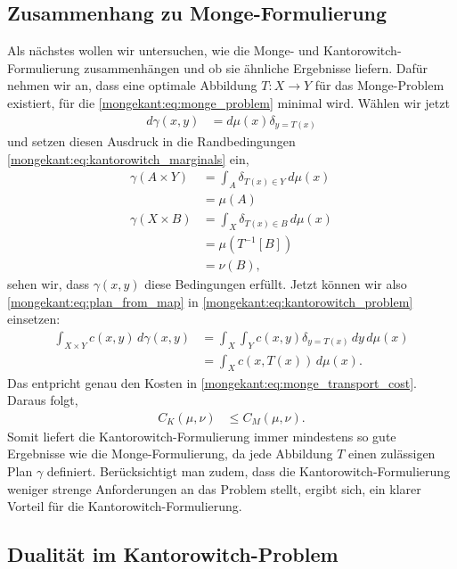 \subsection{Zusammenhang zu Monge-Formulierung%
\label{mongekant:subsection:monge_kantorowitch_connection}}
Als nächstes wollen wir untersuchen,
wie die Monge- und Kantorowitch-Formulierung zusammenhängen und
ob sie ähnliche Ergebnisse liefern.
Dafür nehmen wir an,
dass eine optimale Abbildung $T\colon X \to Y$ für das Monge-Problem existiert,
für die \eqref{mongekant:eq:monge_problem} minimal wird.
Wählen wir jetzt
\begin{align}
d\gamma(x,y)
&=
d\mu(x) \delta_{y=T(x)}
\label{mongekant:eq:plan_from_map}
\end{align}
und setzen diesen Ausdruck
in die Randbedingungen \eqref{mongekant:eq:kantorowitch_marginals} ein,
\begin{align*}
\gamma(A \times Y)
&=
\int_A \delta_{T(x) \in Y}\, d\mu(x)
\\
&=
\mu(A)
\\
\gamma(X \times B)
&=
\int_X \delta_{T(x) \in B}\, d\mu(x)
\\
&=
\mu\left(T^{-1}[B]\right)
\\
&=
\nu(B)
,
\end{align*}
sehen wir,
dass $\gamma(x,y)$ diese Bedingungen erfüllt.
Jetzt können wir also \eqref{mongekant:eq:plan_from_map} in
\eqref{mongekant:eq:kantorowitch_problem} einsetzen:
\begin{align*}
\int_{X \times Y} c(x,y)\, d\gamma(x,y)
&=
\int_X \int_Y c(x,y) \delta_{y=T(x)}\, dy\, d\mu(x)
\\
&=
\int_X c(x, T(x))\, d\mu(x)
.
\end{align*}
Das entpricht genau den Kosten in \eqref{mongekant:eq:monge_transport_cost}.
Daraus folgt,
\begin{align*}
C_K(\mu, \nu)
&\leq
C_M(\mu, \nu)
.
\end{align*}
Somit liefert die Kantorowitch-Formulierung immer mindestens so gute Ergebnisse
wie die Monge-Formulierung,
da jede Abbildung $T$ einen zulässigen Plan $\gamma$ definiert.
Berücksichtigt man zudem,
dass die Kantorowitch-Formulierung weniger strenge Anforderungen an das Problem stellt,
ergibt sich,
ein klarer Vorteil für die Kantorowitch-Formulierung.

\subsection{Dualität im Kantorowitch-Problem%
\label{mongekant:subsection:kantorowitch_duality}}

